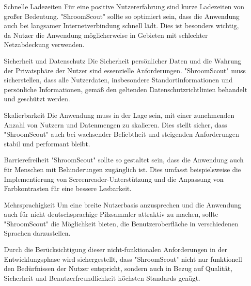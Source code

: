 \documentclass[../main.tex]{subfiles}
\begin{document}
Schnelle Ladezeiten
Für eine positive Nutzererfahrung sind kurze Ladezeiten von großer Bedeutung. "ShroomScout" sollte so optimiert sein, 
dass die Anwendung auch bei langsamer Internetverbindung schnell lädt. Dies ist besonders wichtig, da Nutzer die Anwendung 
möglicherweise in Gebieten mit schlechter Netzabdeckung verwenden.

Sicherheit und Datenschutz
Die Sicherheit persönlicher Daten und die Wahrung der Privatsphäre der Nutzer sind essenzielle Anforderungen. "ShroomScout" 
muss sicherstellen, dass alle Nutzerdaten, insbesondere Standortinformationen und persönliche Informationen, gemäß den 
geltenden Datenschutzrichtlinien behandelt und geschützt werden.

Skalierbarkeit
Die Anwendung muss in der Lage sein, mit einer zunehmenden Anzahl von Nutzern und Datenmengen zu skalieren. Dies stellt 
sicher, dass "ShroomScout" auch bei wachsender Beliebtheit und steigenden Anforderungen stabil und performant bleibt.

Barrierefreiheit
"ShroomScout" sollte so gestaltet sein, dass die Anwendung auch für Menschen mit Behinderungen zugänglich ist. Dies 
umfasst beispielsweise die Implementierung von Screenreader-Unterstützung und die Anpassung von Farbkontrasten für eine 
bessere Lesbarkeit.

Mehrsprachigkeit
Um eine breite Nutzerbasis anzusprechen und die Anwendung auch für nicht deutschsprachige Pilzsammler attraktiv zu machen, 
sollte "ShroomScout" die Möglichkeit bieten, die Benutzeroberfläche in verschiedenen Sprachen darzustellen.

Durch die Berücksichtigung dieser nicht-funktionalen Anforderungen in der Entwicklungsphase wird sichergestellt, dass 
"ShroomScout" nicht nur funktionell den Bedürfnissen der Nutzer entspricht, sondern auch in Bezug auf Qualität, 
Sicherheit und Benutzerfreundlichkeit höchsten Standards genügt.
\end{document}
